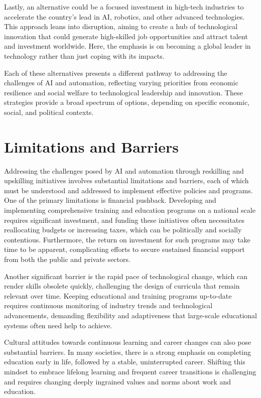 \documentclass[11pt]{article}
\begin{document}
Lastly, an alternative could be a focused investment in high-tech industries to accelerate the country's lead in AI, robotics, and other advanced technologies. This approach leans into disruption, aiming to create a hub of technological innovation that could generate high-skilled job opportunities and attract talent and investment worldwide. Here, the emphasis is on becoming a global leader in technology rather than just coping with its impacts.

Each of these alternatives presents a different pathway to addressing the challenges of AI and automation, reflecting varying priorities from economic resilience and social welfare to technological leadership and innovation. These strategies provide a broad spectrum of options, depending on specific economic, social, and political contexts.

\section{Limitations and Barriers}

Addressing the challenges posed by AI and automation through reskilling and upskilling initiatives involves substantial limitations and barriers, each of which must be understood and addressed to implement effective policies and programs. One of the primary limitations is financial pushback. Developing and implementing comprehensive training and education programs on a national scale requires significant investment, and funding these initiatives often necessitates reallocating budgets or increasing taxes, which can be politically and socially contentious. Furthermore, the return on investment for such programs may take time to be apparent, complicating efforts to secure sustained financial support from both the public and private sectors.

Another significant barrier is the rapid pace of technological change, which can render skills obsolete quickly, challenging the design of curricula that remain relevant over time. Keeping educational and training programs up-to-date requires continuous monitoring of industry trends and technological advancements, demanding flexibility and adaptiveness that large-scale educational systems often need help to achieve.

Cultural attitudes towards continuous learning and career changes can also pose substantial barriers. In many societies, there is a strong emphasis on completing education early in life, followed by a stable, uninterrupted career. Shifting this mindset to embrace lifelong learning and frequent career transitions is challenging and requires changing deeply ingrained values and norms about work and education.
\end{document}
